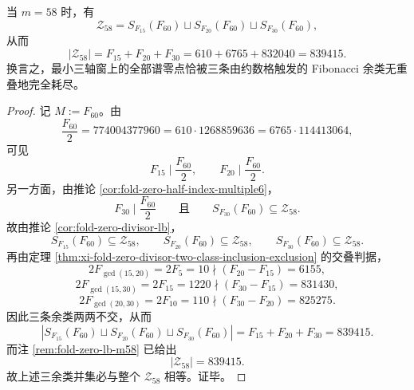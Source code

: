 \begin{corollary}[最小三轴窗零点集合的三余类完全分解]\label{cor:xi-fold-zero-m58-three-coset-exhaustion}
当 \(m=58\) 时，有
\[
\mathcal Z_{58}
=
S_{F_{15}}(F_{60})
\sqcup
S_{F_{20}}(F_{60})
\sqcup
S_{F_{30}}(F_{60}),
\]
从而
\[
|\mathcal Z_{58}|=F_{15}+F_{20}+F_{30}=610+6765+832040=839415.
\]
换言之，最小三轴窗上的全部谱零点恰被三条由约数格触发的 Fibonacci 余类无重叠地完全耗尽。
\end{corollary}
\begin{proof}
记 \(M:=F_{60}\)。由
\[
\frac{F_{60}}{2}
=
774004377960
=
610\cdot 1268859636
=
6765\cdot 114413064,
\]
可见
\[
F_{15}\mid \frac{F_{60}}{2},
\qquad
F_{20}\mid \frac{F_{60}}{2}.
\]
另一方面，由推论 \ref{cor:fold-zero-half-index-multiple6}，
\[
F_{30}\mid \frac{F_{60}}{2}
\qquad\text{且}\qquad
S_{F_{30}}(F_{60})\subseteq \mathcal Z_{58}.
\]
故由推论 \ref{cor:fold-zero-divisor-lb}，
\[
S_{F_{15}}(F_{60})\subseteq \mathcal Z_{58},
\qquad
S_{F_{20}}(F_{60})\subseteq \mathcal Z_{58},
\qquad
S_{F_{30}}(F_{60})\subseteq \mathcal Z_{58}.
\]
再由定理 \ref{thm:xi-fold-zero-divisor-two-class-inclusion-exclusion} 的交叠判据，
\[
2F_{\gcd(15,20)}=2F_5=10\nmid(F_{20}-F_{15})=6155,
\]
\[
2F_{\gcd(15,30)}=2F_{15}=1220\nmid(F_{30}-F_{15})=831430,
\]
\[
2F_{\gcd(20,30)}=2F_{10}=110\nmid(F_{30}-F_{20})=825275.
\]
因此三条余类两两不交，从而
\[
\left|
S_{F_{15}}(F_{60})
\sqcup
S_{F_{20}}(F_{60})
\sqcup
S_{F_{30}}(F_{60})
\right|
=
F_{15}+F_{20}+F_{30}
=
839415.
\]
而注 \ref{rem:fold-zero-lb-m58} 已给出
\[
|\mathcal Z_{58}|=839415.
\]
故上述三余类并集必与整个 \(\mathcal Z_{58}\) 相等。证毕。
\end{proof}

